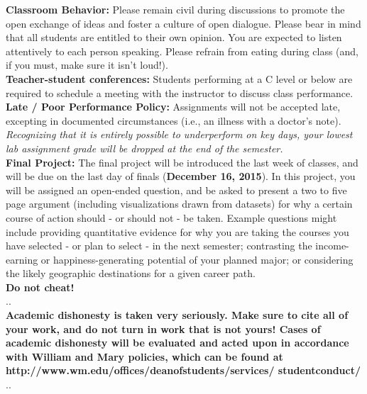\documentclass[11pt]{article}
\begin{document}
\textbf {\large Classroom Behavior:} Please remain civil during discussions to promote the open exchange of ideas and foster a culture of open dialogue.  Please bear in mind that all students are entitled to their own opinion.  You are expected to listen attentively to each person speaking.  Please refrain from eating during class (and, if you must, make sure it isn't loud!).\\

\textbf {\large Teacher-student conferences:} Students performing at a C level or below are required to schedule a meeting with the instructor to discuss class performance.\\

\textbf {\large Late / Poor Performance Policy:} Assignments will not be accepted late, excepting in documented circumstances (i.e., an illness with a doctor's note).  \textit{Recognizing that it is entirely possible to underperform on key days, your lowest lab assignment grade will be dropped at the end of the semester.}\\

\textbf {\large Final Project:} The final project will be introduced the last week of classes, and will be due on the last day of finals (\textbf{December 16, 2015}). In this project, you will be assigned an open-ended question, and be asked to present a two to five page argument (including visualizations drawn from datasets) for why a certain course of action should - or should not - be taken. Example questions might include providing quantitative evidence for why you are taking the courses you have selected - or plan to select - in the next semester; contrasting the income-earning or happiness-generating potential of your planned major; or considering the likely geographic destinations for a given career path. \\

\vspace{4mm}
\textbf {\LARGE Do not cheat!} \\
.\hrulefill . \\
\textbf{Academic dishonesty is taken very seriously.  Make sure to cite all of your work, and do not turn in work that is not yours!  Cases of academic dishonesty will be evaluated and acted upon in accordance with William and Mary policies, which can be found at http://www.wm.edu/offices/deanofstudents/services/
studentconduct/} \\
.\hrulefill . \\
\vspace{8mm}
\end{document}
